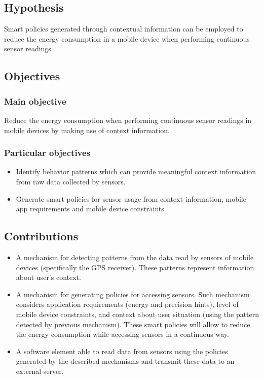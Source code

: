 \subsection{Hypothesis} 
\label{sub:hypothesis}
Smart policies generated through contextual information can be employed to reduce the energy consumption in a mobile device when performing continuous sensor readings.

\subsection{Objectives} 
\label{sub:objectives}

\subsubsection{Main objective}
\label{ssub:main_objective}
Reduce the energy consumption when performing continuous sensor readings in mobile devices by making use of context information. 

\subsubsection{Particular objectives} 
\label{ssub:particular_objectives}
\begin{itemize}
  \item {Identify behavior patterns which can provide meaningful context information from raw data collected by sensors}.
  \item {Generate smart policies for sensor usage from context information, mobile app requirements and mobile device constraints}.
\end{itemize}


\subsection{Contributions} 
\label{sub:contributions}

\begin{itemize}
  \item A mechanism for detecting patterns from the data read by sensors of mobile devices (specifically the GPS receiver).
  These patterns represent information about user's context.
  \item A mechanism for generating policies for accessing sensors.
        Such mechanism considers application requirements (energy and precision hints), level of mobile device constraints, and context about user situation (using the pattern detected by previous mechanism).
        These smart policies will allow to reduce the energy consumption while accessing sensors in a continuous way.
  \item A software element able to read data from sensors using the policies generated by the described mechanisms and transmit these data to an external server.
\end{itemize}